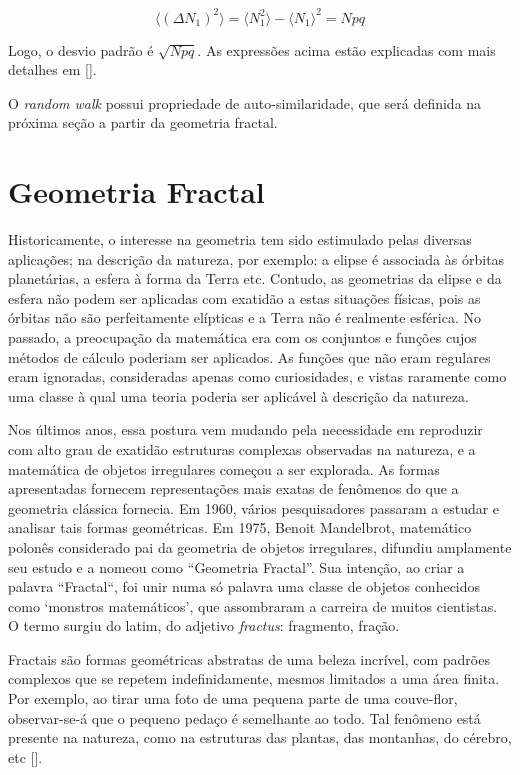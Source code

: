 \documentclass[brazil,ruledheader]{abnt}
\renewcommand{\cite}[1]{[\citeonline{#1}]}
\begin{document}
\begin{equation}
\label{eq:valor-medio-N2-2}
\langle (\Delta N_1)^2 \rangle = \langle N_1^2 \rangle - \langle N_1 \rangle^2
= Npq
\end{equation}

Logo, o desvio padrão é $\sqrt{Npq}$. As expressões acima estão explicadas com
mais detalhes em \cite{Sa97}.

O \emph{random walk} possui propriedade de auto-similaridade, que será definida
na próxima seção a partir da geometria fractal.

\section{Geometria Fractal}

Historicamente, o interesse na geometria tem sido estimulado pelas
diversas aplicações; na descrição da natureza, por exemplo: a elipse é associada
às  órbitas planetárias, a esfera à forma da Terra etc. Contudo, as geometrias
da elipse e da esfera não podem ser aplicadas com exatidão a estas
situações físicas, pois as órbitas não são perfeitamente elípticas e a Terra
não é realmente esférica. No passado, a preocupação da matemática era com
os conjuntos e funções cujos métodos de cálculo poderiam ser aplicados.
As funções que não eram regulares eram ignoradas, consideradas apenas
como curiosidades, e vistas raramente como uma classe à qual uma teoria
poderia ser aplicável à descrição da natureza.

Nos últimos anos, essa postura vem mudando pela necessidade em reproduzir
com alto grau de exatidão estruturas complexas observadas na natureza, e
a matemática de objetos irregulares começou a ser explorada. As
formas apresentadas fornecem representações mais exatas de fenômenos do que
a geometria clássica fornecia. Em 1960, vários pesquisadores passaram a estudar
e analisar tais formas geométricas. Em 1975, Benoit Mandelbrot,
matemático polonês considerado pai da geometria de objetos
irregulares, difundiu amplamente seu estudo e a nomeou como ``Geometria
Fractal''. Sua intenção, ao criar a palavra ``Fractal``, foi unir numa só
palavra
uma classe de objetos conhecidos como ‘monstros matemáticos’, que assombraram
a carreira de muitos cientistas. O termo surgiu do latim, do adjetivo
\emph{fractus}: fragmento, fração.

Fractais são formas geométricas abstratas de uma beleza incrível, com
padrões complexos que se repetem indefinidamente, mesmos limitados a uma área
finita. Por exemplo, ao tirar uma foto  de uma pequena 
parte de uma couve-flor, observar-se-á que o pequeno pedaço é semelhante ao
todo.
Tal fenômeno está presente na natureza, como na estruturas das plantas,
das montanhas, do cérebro, etc \cite{Ja08}.
\end{document}
